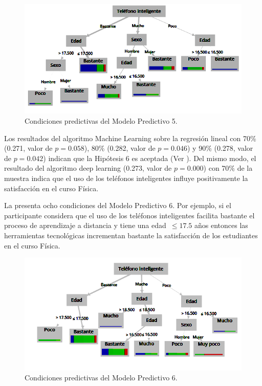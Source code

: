 \documentclass[spanish]{textolivre}
\begin{document}
\begin{figure}[htbp]
\centering
\begin{minipage}{.85\textwidth}
 \includegraphics[width=\textwidth]{Imagem10.png}
 \caption{Condiciones predictivas del Modelo Predictivo 5.}
 \label{fig10}
\end{minipage}
\end{figure}

Los resultados del algoritmo Machine Learning sobre la regresión lineal con 70\% (0.271, valor de $p = 0.058$), 80\% (0.282, valor de $p = 0.046$) y 90\% (0.278, valor de $p = 0.042$) indican que la Hipótesis 6 es aceptada (Ver ). Del mismo modo, el resultado del algoritmo deep learning (0.273, valor de $p = 0.000$) con 70\% de la muestra indica que el uso de los teléfonos inteligentes influye positivamente la satisfacción en el curso Física.

La  presenta ocho condiciones del Modelo Predictivo 6. Por ejemplo, si el participante considera que el uso de los teléfonos inteligentes facilita bastante el proceso de aprendizaje a distancia y tiene una edad~$\leq 17.5$ años entonces las herramientas tecnológicas incrementan bastante la satisfacción de los estudiantes en el curso Física.

\begin{figure}[htbp]
\centering
\begin{minipage}{.85\textwidth}
 \includegraphics[width=\textwidth]{Image11.png}
 \caption{Condiciones predictivas del Modelo Predictivo 6.}
 \label{fig11}
\end{minipage}
\end{figure}
\end{document}
